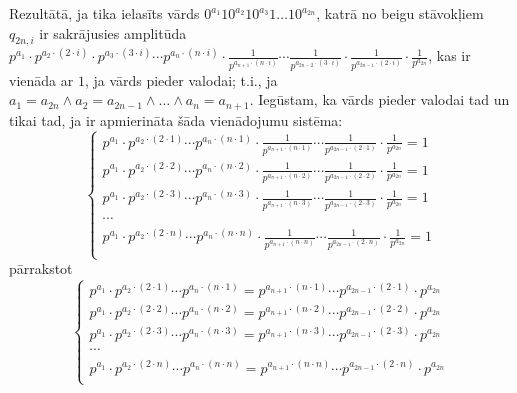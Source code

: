 \documentclass{ludis}
\begin{document}
\begin{pieradijums}
Rezultātā, ja tika ielasīts vārds $0^{a_1}10^{a_2}10^{a_3}1\ldots 10^{a_{2n}}$, katrā no beigu stāvokļiem $q_{2n,i}$ ir sakrājusies amplitūda
$p^{a_1}\cdot p^{a_2 \cdot (2\cdot i)}\cdot p^{a_3 \cdot (3\cdot i)}\cdots p^{a_n \cdot (n\cdot i)} \cdot \frac{1}{p^{a_{n+1} \cdot (n\cdot i)}}\cdots \frac{1}{p^{a_{2n-2} \cdot (3\cdot i)}}\cdot \frac{1}{p^{a_{2n-1} \cdot (2\cdot i)}}\cdot \frac{1}{p^{a_{2n}}}$,
kas ir vienāda ar $1$, ja vārds pieder valodai; t.i., ja
$a_1 = a_{2n} \wedge a_2 = a_{2n-1} \wedge \ldots \wedge a_n = a_{n+1}$.
Iegūstam, ka vārds pieder valodai tad un tikai tad, ja ir apmierināta šāda vienādojumu sistēma:
\[
	\begin{cases}
		p^{a_1}\cdot p^{a_2 \cdot (2\cdot 1)} \cdots p^{a_n \cdot (n\cdot 1)} \cdot \frac{1}{p^{a_{n+1} \cdot (n\cdot 1)}}\cdots \frac{1}{p^{a_{2n-1} \cdot (2\cdot 1)}}\cdot \frac{1}{p^{a_{2n}}} = 1\\
		p^{a_1}\cdot p^{a_2 \cdot (2\cdot 2)}\cdots p^{a_n \cdot (n\cdot 2)} \cdot \frac{1}{p^{a_{n+1} \cdot (n\cdot 2)}}\cdots \frac{1}{p^{a_{2n-1} \cdot (2\cdot 2)}}\cdot \frac{1}{p^{a_{2n}}} = 1\\
		p^{a_1}\cdot p^{a_2 \cdot (2\cdot 3)}\cdots p^{a_n \cdot (n\cdot 3)} \cdot \frac{1}{p^{a_{n+1} \cdot (n\cdot 3)}}\cdots \frac{1}{p^{a_{2n-1} \cdot (2\cdot 3)}}\cdot \frac{1}{p^{a_{2n}}} = 1\\
		\cdots \\
		p^{a_1}\cdot p^{a_2 \cdot (2\cdot n)}\cdots p^{a_n \cdot (n\cdot n)} \cdot \frac{1}{p^{a_{n+1} \cdot (n\cdot n)}}\cdots \frac{1}{p^{a_{2n-1} \cdot (2\cdot n)}}\cdot \frac{1}{p^{a_{2n}}} = 1\\
	\end{cases}
\]
pārrakstot
\[
	\begin{cases}
		p^{a_1}\cdot p^{a_2 \cdot (2\cdot 1)} \cdots p^{a_n \cdot (n\cdot 1)} = p^{a_{n+1} \cdot (n\cdot 1)}\cdots p^{a_{2n-1} \cdot (2\cdot 1)}\cdot p^{a_{2n}}\\
		p^{a_1}\cdot p^{a_2 \cdot (2\cdot 2)} \cdots p^{a_n \cdot (n\cdot 2)} = p^{a_{n+1} \cdot (n\cdot 2)}\cdots p^{a_{2n-1} \cdot (2\cdot 2)}\cdot p^{a_{2n}}\\
		p^{a_1}\cdot p^{a_2 \cdot (2\cdot 3)} \cdots p^{a_n \cdot (n\cdot 3)} = p^{a_{n+1} \cdot (n\cdot 3)}\cdots p^{a_{2n-1} \cdot (2\cdot 3)}\cdot p^{a_{2n}}\\
		\cdots \\
		p^{a_1}\cdot p^{a_2 \cdot (2\cdot n)} \cdots p^{a_n \cdot (n\cdot n)} = p^{a_{n+1} \cdot (n\cdot n)}\cdots p^{a_{2n-1} \cdot (2\cdot n)}\cdot p^{a_{2n}}\\

\end{cases}\]
\end{pieradijums}
\end{document}
